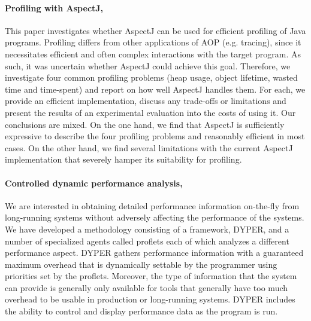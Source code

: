 \paragraph{Profiling with AspectJ, \cite{Pearce:2007:PA:1248445.1248448}}
This paper investigates whether AspectJ can be used for efficient profiling of Java programs.
Profiling differs from other applications of AOP (e.g. tracing), since it necessitates efficient and often complex
interactions with the target program.
As such, it was uncertain whether AspectJ could achieve this goal.
Therefore, we investigate four common profiling problems (heap usage, object lifetime, wasted time and
time-spent) and report on how well AspectJ handles them.
For each, we provide an efficient implementation,
discuss any trade-offs or limitations and present the results of an experimental evaluation into the costs
of using it.
Our conclusions are mixed. On the one hand, we find that AspectJ is sufficiently expressive
to describe the four profiling problems and reasonably efficient in most cases.
On the other hand, we find several limitations with the current AspectJ implementation that severely hamper its suitability for
profiling.

\paragraph{Controlled dynamic performance analysis, \cite{Reiss:2008:CDP:1383559.1383566}}
We are interested in obtaining detailed performance information
on-the-fly from long-running systems without adversely affecting
the performance of the systems.
We have developed a methodology consisting of a framework, DYPER, and a number of
specialized agents called proflets each of which analyzes a
different performance aspect.
DYPER gathers performance information with a guaranteed maximum overhead that is
dynamically settable by the programmer using priorities set by the
proflets.
Moreover, the type of information that the system can
provide is generally only available for tools that generally have too
much overhead to be usable in production or long-running
systems.
DYPER includes the ability to control and display
performance data as the program is run.


